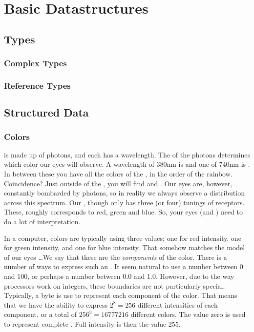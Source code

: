 \chapter{Basic Datastructures}


\section{Types}

\subsection{Complex Types}

\subsection{Reference Types}

\section{Structured Data}

\subsection{Colors}

 is made up of photons, and each  has a wavelength. The  of the photons determines which color our eyes will observe. A wavelength of 380nm is  and one of 740nm is . In between these you have all the colors of the , in the order of the rainbow. Coincidence? Just outside of the , you will find  and . Our eyes are, however, constantly bombarded by photons, so in reality we always observe a distribution across this spectrum. Our , though only has three (or four) tunings of receptors. These, roughly corresponds to red, green and blue. So, your eyes (and ) need to do a lot of interpretation.

In a computer, colors are typically  using three values; one for red intensity, one for green intensity, and one for blue intensity. That somehow matches the model of our eyes \ldots We say that these are the \textsl{components} of the color. There is a number of ways to express such an . It seem natural to use a number between 0 and 100, or perhaps a number between 0.0 and 1.0. However, due to the way processors work on integers, these boundaries are not particularly special. Typically, a byte is use to represent each component of the color. That means that we have the ability to express $2^8=256$ different intensities of each component, or a total of $256^3=16777216$ different colors. The value zero is used to represent complete . Full intensity is then the value 255.

